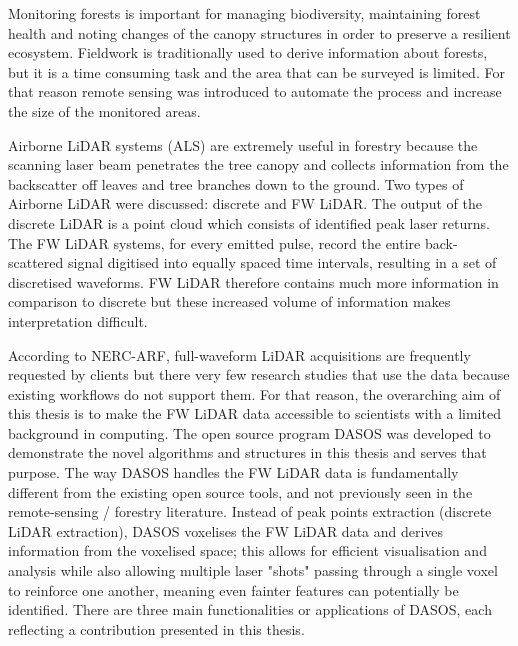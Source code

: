 \documentclass{subfiles}
\begin{document}
\par Monitoring forests is important for managing biodiversity, maintaining forest health and noting changes of the canopy structures in order to preserve a resilient ecosystem.  Fieldwork is traditionally used to derive information about forests, but it is a time consuming task and the area that can be surveyed is limited.  For that reason remote sensing was introduced to automate the process and increase the size of the monitored areas. 

\par Airborne LiDAR systems (ALS) are extremely useful in forestry because the scanning laser beam penetrates the tree canopy and collects information from the backscatter off leaves and tree branches down to the ground. Two types of Airborne LiDAR were discussed: discrete and FW LiDAR. The output of the discrete LiDAR is a point cloud which consists of identified peak laser returns. The FW LiDAR systems, for every emitted pulse, record the entire back-scattered signal digitised into equally spaced time intervals, resulting in a set of discretised waveforms. FW LiDAR therefore contains much more information in comparison to discrete but these increased volume of information makes interpretation difficult. 

\par According to NERC-ARF, full-waveform LiDAR acquisitions are frequently requested by clients but there very few research studies that use the data because existing workflows do not support them. For that reason, the overarching aim of this thesis is to make the FW LiDAR data accessible to scientists with a limited background in computing. The open source program DASOS was developed to demonstrate the novel algorithms and structures in this thesis and serves that purpose. The way DASOS handles the FW LiDAR data is fundamentally different from the existing open source tools, and not previously seen in the remote-sensing / forestry literature. Instead of peak points extraction (discrete LiDAR extraction), DASOS voxelises the FW LiDAR data and derives information from the voxelised space; this allows for efficient visualisation and analysis while also allowing multiple laser "shots" passing through a single voxel to reinforce one another, meaning even fainter features can potentially be identified. There are three main functionalities or applications of DASOS, each reflecting a contribution presented in this thesis.
\end{document}
